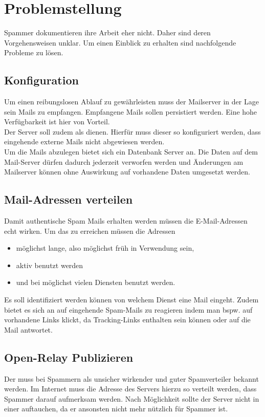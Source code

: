 \documentclass[a4paper,11pt,singlespacing]{article}
\begin{document}
\newpage


\section{Problemstellung}\label{sec:Problemstellung}
	Spammer dokumentieren ihre Arbeit eher nicht.
	Daher sind deren Vorgehensweisen unklar.
	Um einen Einblick zu erhalten sind nachfolgende Probleme zu lösen.

	\subsection{Konfiguration}\label{sec:ProblemstellungKonfiguration}
		Um einen reibungslosen Ablauf zu gewährleisten muss der Mailserver in der Lage sein Mails zu empfangen.
		Empfangene Mails sollen persistiert werden.
		Eine hohe Verfügbarkeit ist hier von Vorteil.
		\\
		Der Server soll zudem als  dienen.
		Hierfür muss dieser so konfiguriert werden, dass eingehende externe Mails nicht abgewiesen werden.
		\\
		Um die Mails abzulegen bietet sich ein Datenbank Server an.
		Die Daten auf dem Mail-Server dürfen dadurch jederzeit verworfen werden und Änderungen am Mailserver können ohne Auswirkung auf vorhandene Daten umgesetzt werden.

	\subsection{Mail-Adressen verteilen}\label{sec:ProblemstellungMailsVerteilen}
		Damit authentische Spam Mails erhalten werden müssen die E-Mail-Adressen echt wirken.
		Um das zu erreichen müssen die Adressen
		\begin{itemize}
		\item möglichst lange, also möglichst früh in Verwendung sein,
		\item aktiv benutzt werden
		\item und bei möglichst vielen Diensten benutzt werden.
		\end{itemize}
		Es soll identifiziert werden können von welchem Dienst eine Mail eingeht.
		Zudem bietet es sich an auf eingehende Spam-Mails zu reagieren indem man bspw. auf vorhandene Links klickt, da Tracking-Links enthalten sein können oder auf die Mail antwortet. %

	\subsection{Open-Relay Publizieren}\label{sec:ProblemstellungPublizieren}
		Der  muss bei Spammern als unsicher wirkender  und guter Spamverteiler bekannt werden.
		Im Internet muss die Adresse des Servers hierzu so verteilt werden, dass Spammer darauf aufmerksam werden.
		Nach Möglichkeit sollte der Server nicht in einer   auftauchen, da er ansonsten nicht mehr nützlich für Spammer ist.
\end{document}
